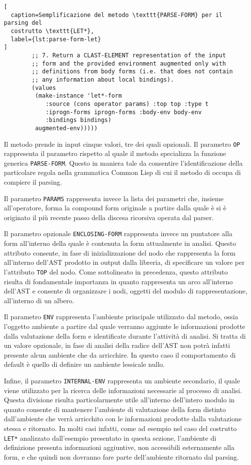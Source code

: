 \begin{lstlisting}[
  caption=Semplificazione del metodo \texttt{PARSE-FORM} per il parsing del
  costrutto \texttt{LET*},
  label={lst:parse-form-let}
]
        ;; 7. Return a CLAST-ELEMENT representation of the input
        ;; form and the provided environment augmented only with
        ;; definitions from body forms (i.e. that does not contain
        ;; any information about local bindings).
        (values
         (make-instance 'let*-form
            :source (cons operator params) :top top :type t
            :iprogn-forms iprogn-forms :body-env body-env
            :bindings bindings)
         augmented-env)))))

\end{lstlisting}

Il metodo prende in input cinque valori, tre dei quali opzionali. Il parametro
\texttt{OP} rappresenta il parametro rispetto al quale il metodo specializza la
funzione generica \texttt{PARSE-FORM}. Questo in maniera tale da consentire
l'identificazione della particolare regola nella grammatica Common Lisp di cui
il metodo di occupa di compiere il parsing.

Il parametro \texttt{PARAMS} rappresenta invece la lista dei parametri che,
insieme all'operatore, forma la compound form originale a partire dalla quale è
si è originato il più recente passo della discesa ricorsiva operata dal parser.

Il parametro opzionale \texttt{ENCLOSING-FORM} rappresenta invece un puntatore
alla form all'interno della quale è contenuta la form attualmente in analisi.
Questo attributo consente, in fase di inizializzazione del nodo che rappresenta
la form all'interno dell'AST prodotto in output dalla libreria, di specificare
un valore per l'attributo \texttt{TOP} del nodo. Come sottolineato in
precedenza, questo attributo risulta di fondamentale importanza in quanto
rappresenta un arco all'interno dell'AST e consente di organizzare i nodi,
oggetti del modulo di rappresentazione, all'interno di un albero.

Il parametro \texttt{ENV} rappresenta l'ambiente principale utilizzato dal
metodo, ossia l'oggetto ambiente a partire dal quale verranno aggiunte le
informazioni prodotte dalla valutazione della form e identificate durante
l'attività di analisi. Si tratta di un valore opzionale, in fase di analisi
della radice dell'AST non potrà infatti presente alcun ambiente che da
arricchire. In questo caso il comportamento di default è quello di definire un
ambiente lessicale nullo.

Infine, il parametro \texttt{INTERNAL-ENV} rappresenta un ambiente secondario,
il quale viene utilizzato per la ricerca delle informazioni necessarie al
processo di analisi. Questa divisione risulta particolarmente utile all'interno
dell'intero modulo in quanto consente di mantenere l'ambiente di valutazione
della form distinto dall'ambiente che verrà arricchito con le informazioni
prodotte dalla valutazione stessa e ritornato. In molti casi infatti, come ad
esempio nel caso del costrutto \texttt{LET*} analizzato dall'esempio presentato
in questa sezione, l'ambiente di definizione presenta informazioni aggiuntive,
non accessibili esternamente alla form, e che quindi non dovranno fare parte
dell'ambiente ritornato dal parsing.

